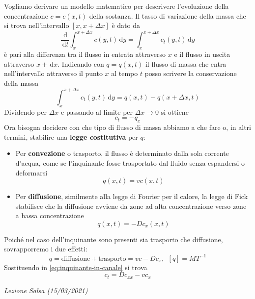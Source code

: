 \documentclass[10pt,a4paper,twoside,openright]{book}
\newcounter{conteggioS}
\newcommand{\LezioneS}[1]{
	\stepcounter{conteggioS}
	\textit{Lezione Salsa \arabic{conteggioS} (#1)}
	}
\newcommand{\de}{\,\mathrm d}
\newcommand{\dx}{\de x}
\newcommand{\dy}{\de y}
\newcommand{\dt}{\de t}
\begin{document}
Vogliamo derivare un modello matematico per descrivere l'evoluzione della concentrazione $\displaystyle c=c(x,t)$ della sostanza. Il tasso di variazione della massa che si trova nell'intervallo $\displaystyle [ x,x+\Delta x]$ è dato da
\begin{equation*}
    \frac{\de}{\dt}\int ^{x+\Delta x}_{x} c(y,t) \dy=\int ^{x+\Delta x}_{x} c_{t}(y,t) \dy
\end{equation*}
è pari alla differenza tra il flusso in entrata attraverso $x$ e il flusso in uscita attraverso $x+\dx$. Indicando con $\displaystyle q=q(x,t)$ il flusso di massa che entra nell'intervallo attraverso il punto $x$ al tempo $t$ posso scrivere la conservazione della massa
\begin{equation*}
    \int ^{x+\Delta x}_{x} c_{t}(y,t) \dy=q(x,t) -q(x+\Delta x,t)
\end{equation*}
Dividendo per $\displaystyle \Delta x$ e passando al limite per $\displaystyle \Delta x\rightarrow 0$ si ottiene
\begin{equation}
    c_{t} =-q_{x}
    \label{eq:inquinante-in-canale}
\end{equation}
Ora bisogna decidere con che tipo di flusso di massa abbiamo a che fare o, in altri termini, stabilire una \textbf{legge costitutiva }per $q$:
\begin{itemize}
    \item Per \textbf{convezione} o trasporto, il flusso è determinato dalla sola corrente d'acqua, come se l'inquinante fosse trasportato dal fluido senza espandersi o deformarsi
          \begin{equation*}
              q(x,t) =vc(x,t)
          \end{equation*}
    \item Per \textbf{diffusione}, similmente alla legge di Fourier per il calore, la legge di Fick stabilisce che la diffusione avviene da zone ad alta concentrazione verso zone a bassa concentrazione
          \begin{equation*}
              q(x,t) =-Dc_{x}(x,t)
          \end{equation*}
\end{itemize}

Poiché nel caso dell'inquinante sono presenti sia trasporto che diffusione, sovrapporremo i due effetti:
\begin{equation*}
    q=\text{diffusione} +\text{trasporto} =vc-Dc_{x},\ \ [ q] =MT^{-1}
\end{equation*}
Sostituendo in \eqref{eq:inquinante-in-canale} si trova
\begin{equation*}
    \boxed{c_{t} =Dc_{xx} -vc_{x}}
\end{equation*}
\LezioneS{15/03/2021}
\end{document}
